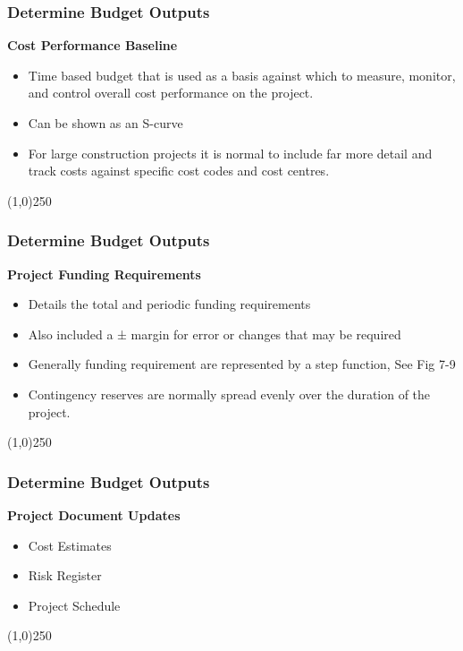 \begin{frame}
\frametitle{Determine Budget \hfill\hfill Outputs}
\textbf{Cost Performance Baseline}
\begin{itemize}
	\item Time based budget that is used as a basis against which to measure, monitor, and control overall cost performance on the project.
	\item Can be shown as an S-curve
	\item For large construction projects it is normal to include far more detail and track costs against specific cost codes and cost centres.
\end{itemize}
\end{frame}
\begin{center}\line(1,0){250}\end{center}






\begin{frame}
\frametitle{Determine Budget \hfill\hfill Outputs}

\textbf{Project Funding Requirements}
\begin{itemize}
	\item Details the total and periodic funding requirements
	\item Also included a ± margin for error or changes that may be required
	\item Generally funding requirement are represented by a step function, See Fig 7-9
	\item Contingency reserves are normally spread evenly over the duration of the project.  
\end{itemize}
\end{frame}
\begin{center}\line(1,0){250}\end{center}







\begin{frame}
\frametitle{Determine Budget \hfill\hfill Outputs}
\textbf{Project Document Updates}
\begin{itemize}
	\item Cost Estimates
	\item Risk Register
	\item Project Schedule
\end{itemize}
\end{frame}
\begin{center}\line(1,0){250}\end{center}






